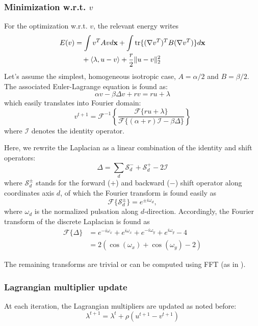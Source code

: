 \subsubsection{Minimization w.r.t. $v$}
For the optimization w.r.t. $v$, the relevant energy writes
\begin{align}
E(v) &= \int v^T A v d\mathbf{x} + \int \operatorname{tr}\{(\nabla v^T)^T B (\nabla v^T)\} d\mathbf{x}\\
&\quad + \langle \lambda, u-v \rangle + \frac{r}{2} \| u - v \|_2^2\nonumber
\end{align}
Let's assume the simplest, homogeneous isotropic case, $A = \alpha/2$ 
and $B = \beta/2$. The associated Euler-Lagrange equation is found as:
\begin{equation}
\alpha v - \beta\Delta v + rv = ru + \lambda
\end{equation}
which easily translates into Fourier domain:
\begin{equation}
v^{t+1} = \mathcal{F}^{-1}\left\{ \frac{\mathcal{F}\{ru + \lambda\}}{\mathcal{F}\{(\alpha+r)\mathcal{I}-\beta\Delta\}} \right\}
\end{equation}
where $\mathcal{I}$ denotes the identity operator.

Here, we rewrite the Laplacian as a linear combination of the identity and shift operators:
\begin{equation}
\Delta = \sum\limits_d \mathcal{S}_d^- + \mathcal{S}_d^+ - 2 \mathcal{I}
\end{equation}
where $\mathcal{S}_{d}^{\pm}$ stands for the forward ($+$) and backward ($-$) shift 
operator along coordinates axis $d$, of which the Fourier transform is found easily as
\begin{equation}
\mathcal{F}\{\mathcal{S}_{d}^{\pm}\} = e^{\pm i\omega_{d}},
\end{equation}
where $\omega_{d}$ is the normalized pulsation along $d$-direction.  Accordingly, the 
Fourier transform of the discrete Laplacian is found as
\begin{align}
\mathcal{F}\{\Delta\} &= e^{-i\omega_x } + e^{i\omega_x } + e^{-i\omega_y } + e^{i\omega_y } - 4\nonumber\\
&= 2\left( \cos(\omega_x) + \cos(\omega_y) - 2 \right)
\end{align}

The remaining transforms are trivial or can be computed using FFT (as in \citep{estellers_efficient_2011}).


\subsubsection{Lagrangian multiplier update}
At each iteration, the Lagrangian multipliers are updated as noted before:
\begin{equation}
\lambda^{t+1} = \lambda^t + \rho(u^{t+1}-v^{t+1})
\end{equation}

